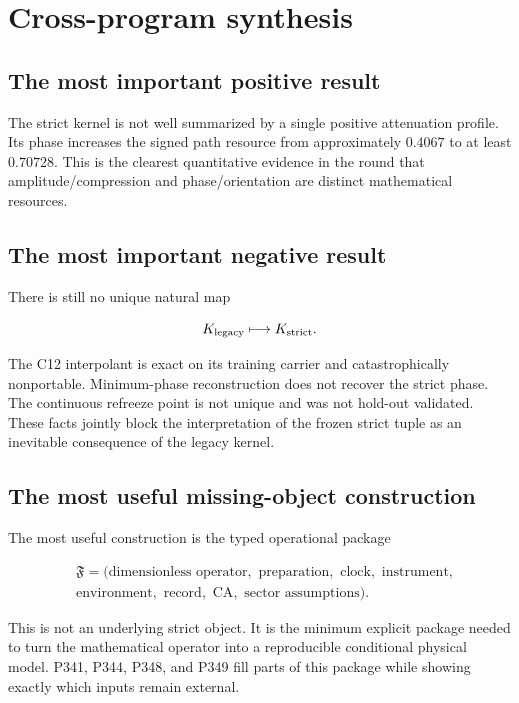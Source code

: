 \documentclass[11pt,a4paper,openany]{report}
\begin{document}
\chapter{Cross-program synthesis}

\section{The most important positive result}

The strict kernel is not well summarized by a single positive attenuation profile. Its phase increases the signed path resource from approximately \(0.4067\) to at least \(0.70728\). This is the clearest quantitative evidence in the round that amplitude/\allowbreak{}compression and phase/\allowbreak{}orientation are distinct mathematical resources.

\section{The most important negative result}

There is still no unique natural map

\[
K_{\rm legacy}\longmapsto K_{\rm strict}.
\]

The C12 interpolant is exact on its training carrier and catastrophically nonportable. Minimum-phase reconstruction does not recover the strict phase. The continuous refreeze point is not unique and was not hold-out validated. These facts jointly block the interpretation of the frozen strict tuple as an inevitable consequence of the legacy kernel.

\section{The most useful missing-object construction}

The most useful construction is the typed operational package

\[
\begin{aligned}
&\mathfrak F=
\big(
\text{dimensionless operator},\text{ preparation},\text{ clock},\text{ instrument},
\\
&\text{environment},\text{ record},\text{ CA},\text{ sector assumptions}
\big).
\end{aligned}
\]

This is not an underlying strict object. It is the minimum explicit package needed to turn the mathematical operator into a reproducible conditional physical model. P341, P344, P348, and P349 fill parts of this package while showing exactly which inputs remain external.
\end{document}
